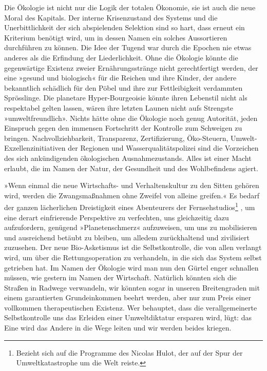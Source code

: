 Die Ökologie ist nicht nur die Logik der totalen Ökonomie, sie ist
auch die neue Moral des Kapitals. Der interne Krisenzustand des
Systems und die Unerbittlichkeit der sich abspielenden Selektion
sind so hart, dass erneut ein Kriterium benötigt wird, um in
dessen Namen ein solches Aussortieren durchführen zu können. Die
Idee der Tugend war durch die Epochen nie etwas anderes als die
Erfindung der Liederlichkeit. Ohne die Ökologie könnte die
gegenwärtige Existenz zweier Ernährungsstränge nicht gerechtfertigt
werden, der eine »gesund und biologisch« für die Reichen und ihre
Kinder, der andere bekanntlich schädlich für den Pöbel und ihre zur
Fettleibigkeit verdammten Sprösslinge. Die planetare
Hyper-Bourgeoisie könnte ihren Lebenstil nicht als respektabel
gelten lassen, wären ihre letzten Launen nicht aufs Strengste
»umweltfreundlich». Nichts hätte ohne die Ökologie noch genug
Autorität, jeden Einspruch gegen den immensen Fortschritt der
Kontrolle zum Schweigen zu bringen.
Nachvollziehbarkeit, Transparenz, Zertifizierung, Öko-Steuern,
Umwelt-Exzellenzinitiativen der Regionen und Wasserqualitätspolizei
sind die Vorzeichen des sich ankündigenden ökologischen
Ausnahmezustands. Alles ist einer Macht erlaubt, die im Namen der
Natur, der Gesundheit und des Wohlbefindens agiert.

»Wenn einmal die neue Wirtschafts- und Verhaltenskultur zu den
Sitten gehören wird, werden die Zwangsmaßnahmen ohne Zweifel von
alleine greifen.« Es bedarf der ganzen lächerlichen Dreistigkeit
eines Abenteurers der Fernsehstudios\footnote{
Bezieht sich auf die Programme des Nicolas Hulot, der auf der
Spur der Umweltkatastrophe um die Welt reiste.
}%
, um eine derart einfrierende
Perspektive zu verfechten, uns gleichzeitig dazu aufzufordern,
genügend »Planetenschmerz« aufzuweisen, um uns zu mobilisieren und
ausreichend betäubt zu bleiben, um alledem zurückhaltend und
zivilisiert zuzusehen. Der neue Bio-Asketismus ist die
Selbstkontrolle, die von allen verlangt wird, um über die
Rettungsoperation zu verhandeln, in die sich das System selbst
getrieben hat. Im Namen der Ökologie wird man nun den Gürtel enger
schnallen müssen, wie gestern im Namen der Wirtschaft. Natürlich
könnten sich die Straßen in Radwege verwandeln, wir könnten sogar
in unseren Breitengraden mit einem garantierten Grundeinkommen
beehrt werden, aber nur zum Preis einer vollkommen therapeutischen
Existenz. Wer behauptet, dass die verallgemeinerte Selbstkontrolle
uns das Erleiden einer Umweltdiktatur ersparen wird, lügt: das Eine
wird das Andere in die Wege leiten und wir werden beides kriegen.


